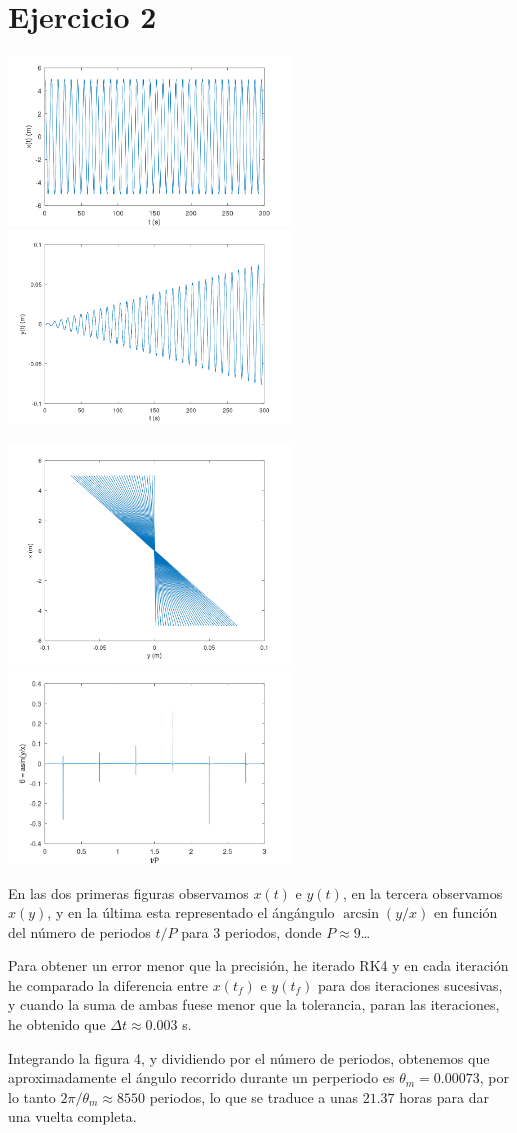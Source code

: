 \documentclass{article}
\begin{document}
\section*{Ejercicio 2}
\includegraphics[width=7.5cm]{x.png}
\includegraphics[width=7.5cm]{y.png}

\includegraphics[width=7.5cm]{xy.png}
\includegraphics[width=7.5cm]{theta.png}

En las dos primeras figuras observamos $x(t)$ e $y(t)$, en la tercera observamos $x(y)$, y en la última esta representado el ángángulo $\arcsin(y/x)$ en función del número de periodos $t/P$ para 3 periodos, donde $P\approx9$\dots

Para obtener un error menor que la precisión, he iterado RK4 y en cada iteración he comparado la diferencia entre $x(t_f)$ e $y(t_f)$ para dos iteraciones sucesivas, y cuando la suma de ambas fuese menor que la tolerancia, paran las iteraciones, he obtenido que $\Delta t \approx 0.003$ s. 

Integrando la figura 4, y dividiendo por el número de periodos, obtenemos que aproximadamente el ángulo recorrido durante un perperiodo es $\theta_m=0.00073$, por lo tanto $2\pi/\theta_m \approx 8550$ periodos, lo que se traduce a unas $21.37$ horas para dar una vuelta completa.
\end{document}

